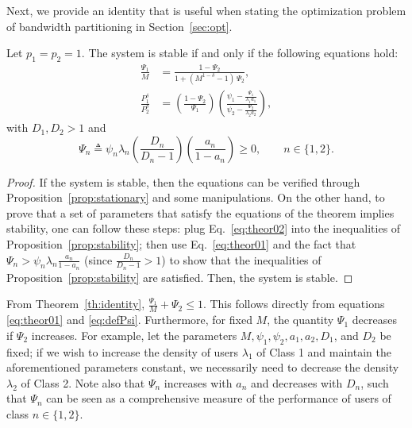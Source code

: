Next, we provide an identity that is useful when stating the optimization problem of bandwidth partitioning in Section~\ref{sec:opt}.

\begin{theorem}\label{th:identity}
	Let $p_1=p_2=1$. The system is stable if and only if the following equations hold:
    \begin{align}
    	\frac{\Psi_1}{M} 
        	&= \frac{1-\Psi_2}{1+(M^{1-\delta}-1)\,\Psi_2}, \label{eq:theor01} \\
        \frac{P_1^\delta}{P_2^\delta}
    		&= \left(\frac{1-\Psi_2}{\Psi_1}\right) \left(\frac{\psi_1-\frac{\Psi_1}{\lambda_1 a_1}}
        		{\psi_2-\frac{\Psi_2}{\lambda_2 a_2}}\right), \label{eq:theor02} 
    \end{align}
    with $D_1, D_2 > 1$ and 
\begin{equation} \label{eq:defPsi}
\Psi_n \triangleq \psi_n\lambda_n \left(\frac{D_n}{D_n-1}\right) \left(\frac{a_n}{1-a_n}\right) \ge 0, \qquad n\in\{1,2\}.
\end{equation}    
\end{theorem}

\begin{proof}
	If the system is stable, then the equations can be verified through Proposition~\ref{prop:stationary} and some manipulations. On the other hand, to prove that a set of parameters that satisfy the equations of the theorem implies stability, one can follow these steps: plug Eq.~\eqref{eq:theor02} into the inequalities of Proposition~\ref{prop:stability}; then use Eq.~\eqref{eq:theor01} and the fact that $\Psi_n > \psi_n\lambda_n\frac{a_n}{1-a_n}$ (since $\frac{D_n}{D_n-1}>1$) to show that the inequalities of Proposition~\ref{prop:stability} are satisfied. Then, the system is stable.
\end{proof}
\begin{remark} \label{rmk:Th.Stb.}
	From Theorem~\ref{th:identity},
	$\frac{\Psi_1}{M} + \Psi_2 \le 1$.
	This follows directly from equations \eqref{eq:theor01} and \eqref{eq:defPsi}.
	Furthermore, for fixed $M$, the quantity $\Psi_1$ decreases if $\Psi_2$ increases. For example, let the parameters $M,\psi_1,\psi_2,a_1,a_2,D_1$, and $D_2$ be fixed; if we wish to increase the density of users $\lambda_1$ of Class 1 and maintain the aforementioned parameters constant, we necessarily need to decrease the density $\lambda_2$ of Class 2.
	Note also that $\Psi_n$ increases with $a_n$ and decreases with $D_n$, such that $\Psi_n$ can be seen as a comprehensive measure of the performance of users of class $n \in \{1,2\}$.
\end{remark}

